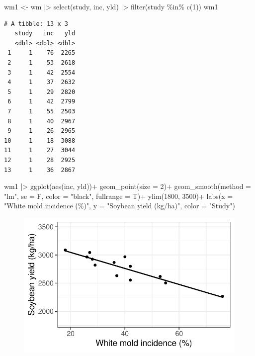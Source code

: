 \documentclass[
  letterpaper,
  DIV=11,
  numbers=noendperiod]{scrreprt}
\newenvironment{Shaded}{\begin{snugshade}}{\end{snugshade}}
\newcommand{\AttributeTok}[1]{\textcolor[rgb]{0.40,0.45,0.13}{#1}}
\newcommand{\DecValTok}[1]{\textcolor[rgb]{0.68,0.00,0.00}{#1}}
\newcommand{\FunctionTok}[1]{\textcolor[rgb]{0.28,0.35,0.67}{#1}}
\newcommand{\NormalTok}[1]{\textcolor[rgb]{0.00,0.23,0.31}{#1}}
\newcommand{\OtherTok}[1]{\textcolor[rgb]{0.00,0.23,0.31}{#1}}
\newcommand{\SpecialCharTok}[1]{\textcolor[rgb]{0.37,0.37,0.37}{#1}}
\newcommand{\StringTok}[1]{\textcolor[rgb]{0.13,0.47,0.30}{#1}}
\begin{document}
\begin{Shaded}
\begin{Highlighting}[]
\NormalTok{wm1 }\OtherTok{\textless{}{-}}\NormalTok{ wm }\SpecialCharTok{|\textgreater{}} 
  \FunctionTok{select}\NormalTok{(study, inc, yld) }\SpecialCharTok{|\textgreater{}} 
  \FunctionTok{filter}\NormalTok{(study }\SpecialCharTok{\%in\%} \FunctionTok{c}\NormalTok{(}\DecValTok{1}\NormalTok{)) }
\NormalTok{wm1}
\end{Highlighting}
\end{Shaded}

\begin{verbatim}
# A tibble: 13 x 3
   study   inc   yld
   <dbl> <dbl> <dbl>
 1     1    76  2265
 2     1    53  2618
 3     1    42  2554
 4     1    37  2632
 5     1    29  2820
 6     1    42  2799
 7     1    55  2503
 8     1    40  2967
 9     1    26  2965
10     1    18  3088
11     1    27  3044
12     1    28  2925
13     1    36  2867
\end{verbatim}

\begin{Shaded}
\begin{Highlighting}[]
\NormalTok{wm1 }\SpecialCharTok{|\textgreater{}} 
  \FunctionTok{ggplot}\NormalTok{(}\FunctionTok{aes}\NormalTok{(inc, yld))}\SpecialCharTok{+}
  \FunctionTok{geom\_point}\NormalTok{(}\AttributeTok{size =} \DecValTok{2}\NormalTok{)}\SpecialCharTok{+}
  \FunctionTok{geom\_smooth}\NormalTok{(}\AttributeTok{method =} \StringTok{"lm"}\NormalTok{, }\AttributeTok{se =}\NormalTok{ F, }\AttributeTok{color =} \StringTok{"black"}\NormalTok{, }\AttributeTok{fullrange =}\NormalTok{ T)}\SpecialCharTok{+}
  \FunctionTok{ylim}\NormalTok{(}\DecValTok{1800}\NormalTok{, }\DecValTok{3500}\NormalTok{)}\SpecialCharTok{+}
  \FunctionTok{labs}\NormalTok{(}\AttributeTok{x =} \StringTok{"White mold incidence (\%)"}\NormalTok{,}
       \AttributeTok{y =} \StringTok{"Soybean yield (kg/ha)"}\NormalTok{,}
       \AttributeTok{color =} \StringTok{"Study"}\NormalTok{)}
\end{Highlighting}
\end{Shaded}

\begin{figure}[H]

{\centering \includegraphics{yieldloss-regression-models_files/figure-pdf/unnamed-chunk-3-1.pdf}

}

\end{figure}
\end{document}
